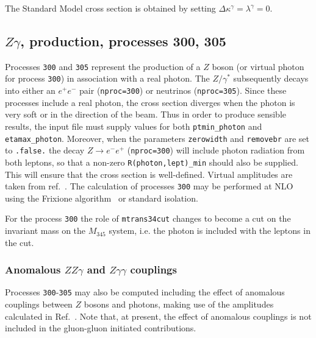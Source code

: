 \documentclass[12pt]{article}
\begin{document}
The Standard Model cross section is obtained by setting $\Delta\kappa^\gamma = \lambda^\gamma = 0$.

\subsection{$Z\gamma$, production, processes 300, 305}
\label{subsec:zgamma}


Processes {\tt 300} and {\tt 305} represent the production of a $Z$ boson (or virtual photon for process {\tt 300})
in association with a real photon. The $Z/\gamma^*$ subsequently decays into 
either an $e^+ e^-$ pair ({\tt nproc=300}) or neutrinos ({\tt nproc=305}).
Since these processes include a real photon, the cross section diverges
when the photon is very soft or in the direction of the beam.
Thus in order to produce sensible results, the input file must supply values for both
{\tt ptmin\_photon} and {\tt etamax\_photon}. Moreover, when the parameters {\tt zerowidth}
and {\tt removebr} are set to {\tt .false.} the decay $Z \to e^- e^+$ ({\tt nproc=300})
will include photon radiation from both leptons, so that a non-zero {\tt R(photon,lept)\_min}
should also be supplied. This will ensure that the cross section is well-defined.
Virtual amplitudes are taken from ref.~\cite{Dixon:1998py}.
The calculation of processes {\tt 300} may be performed
at NLO using the Frixione algorithm~\cite{Frixione:1998jh} or standard isolation. 

For the process {\tt 300}  the role of {\tt mtrans34cut} changes to become a cut 
on the invariant mass on the $M_{345}$ system, i.e. the photon is included with the leptons in the cut. 

\subsubsection{Anomalous $ZZ\gamma$ and $Z\gamma\gamma$ couplings}
Processes {\tt 300}-{\tt 305} may also be computed including the effect of anomalous couplings between $Z$ bosons
and photons, making use of the amplitudes calculated in Ref.~\cite{DeFlorian:2000sg}.
Note that, at present, the effect of anomalous couplings is not included in the gluon-gluon
initiated contributions.
\end{document}
